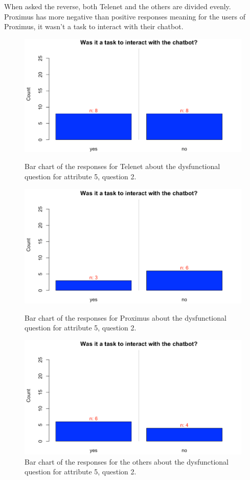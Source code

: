 When asked the reverse, both Telenet and the others are divided evenly. Proximus has more negative than positive responses meaning for the users of Proximus, it wasn't a task to interact with their chatbot.\\
\begin{figure}[!htb]
	\includegraphics[width=\linewidth]{../LaTeX/Figures/Comparative/DQ5Tb.png}
	\caption{Bar chart of the responses for Telenet about the dysfunctional question for attribute 5, question 2.}\label{fig:DQ5Tb}
	\endminipage\hfill
	\includegraphics[width=\linewidth]{../LaTeX/Figures/Comparative/DQ5Pb.png}
	\caption{Bar chart of the responses for Proximus about the dysfunctional question for attribute 5, question 2.}\label{fig:DQ5Pb}
	\endminipage\hfill
	\includegraphics[width=\linewidth]{../LaTeX/Figures/Comparative/DQ5Ob.png}
	\caption{Bar chart of the responses for the others about the dysfunctional question for attribute 5, question 2.}\label{fig:DQ5Ob}
	\endminipage\hfill
\end{figure}
